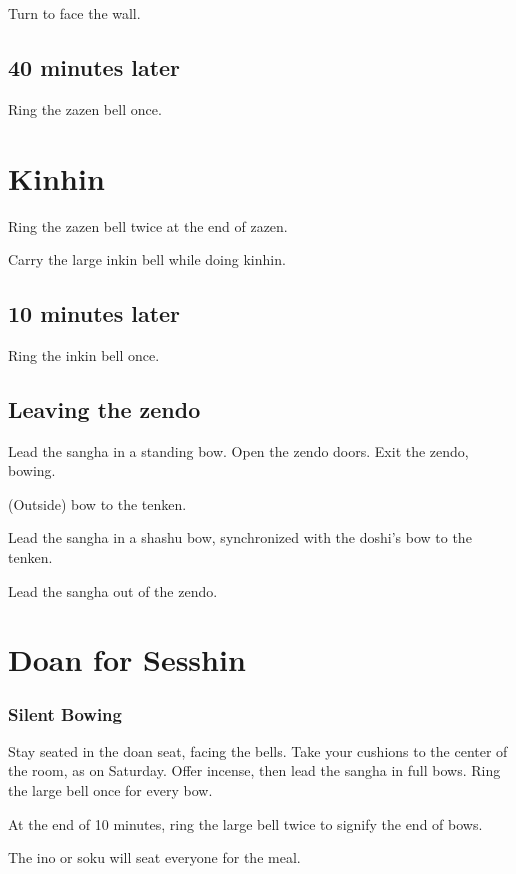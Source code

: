 \documentclass{kdo}
\begin{document}
\begin{services}
Turn to face the wall.

\section*{40 minutes later}

\doan Ring the zazen bell once. \bigspace\zazenbell

\chapter{Kinhin}
\doan Ring the zazen bell twice at the end of zazen.
\kinhinBells

Carry the large inkin bell while doing kinhin.

\section*{10 minutes later}

\doan Ring the inkin bell once. \bigspace\zazenbell

\section*{Leaving the zendo}
\doshi Lead the sangha in a standing bow.
\tenken Open the zendo doors.
\doshi Exit the zendo, bowing.

(Outside) bow to the tenken.

\doan Lead the sangha in a shashu bow, synchronized with the doshi's bow to the
tenken.

Lead the sangha out of the zendo.

\chapter{Doan for Sesshin}
\subsection*{Silent Bowing}
\doan Stay seated in the doan seat, facing the bells.
\sangha Take your cushions to the center of the room, as on Saturday.
\doshi Offer incense, then lead the sangha in full bows.
\doan Ring the large bell once for every bow. \bigspace\largebell

At the end of 10 minutes, ring the large bell twice to signify the end of bows.

\bline{\hfill\largebell\hfill\largebell\hfill\null}

The ino or soku will seat everyone for the meal.


\end{services}
\end{document}
